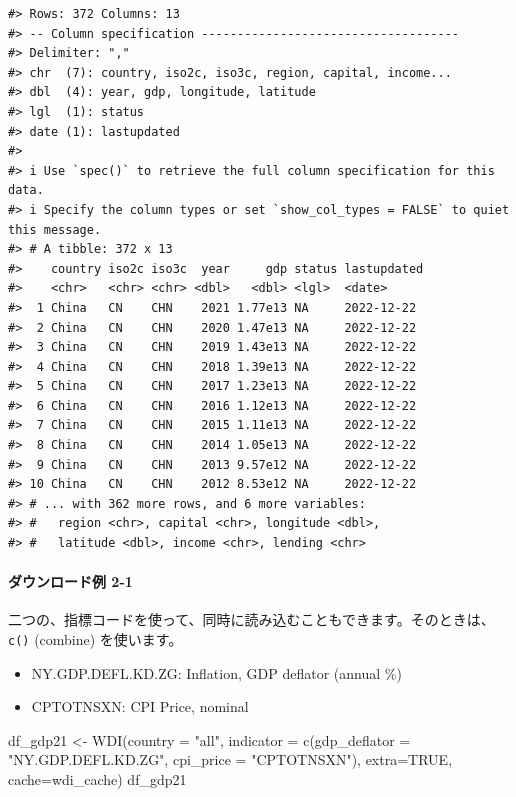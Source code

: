 \documentclass[
]{bxjsbook}
\newenvironment{Shaded}{\begin{snugshade}}{\end{snugshade}}
\newcommand{\AttributeTok}[1]{\textcolor[rgb]{0.77,0.63,0.00}{#1}}
\newcommand{\ConstantTok}[1]{\textcolor[rgb]{0.00,0.00,0.00}{#1}}
\newcommand{\FunctionTok}[1]{\textcolor[rgb]{0.00,0.00,0.00}{#1}}
\newcommand{\NormalTok}[1]{#1}
\newcommand{\OtherTok}[1]{\textcolor[rgb]{0.56,0.35,0.01}{#1}}
\newcommand{\StringTok}[1]{\textcolor[rgb]{0.31,0.60,0.02}{#1}}
\providecommand{\tightlist}{%
  \setlength{\itemsep}{0pt}\setlength{\parskip}{0pt}}
\theoremstyle{definition}
\theoremstyle{definition}
\theoremstyle{definition}
\theoremstyle{definition}
\theoremstyle{remark}
\begin{document}
\begin{verbatim}
#> Rows: 372 Columns: 13
#> -- Column specification ------------------------------------
#> Delimiter: ","
#> chr  (7): country, iso2c, iso3c, region, capital, income...
#> dbl  (4): year, gdp, longitude, latitude
#> lgl  (1): status
#> date (1): lastupdated
#> 
#> i Use `spec()` to retrieve the full column specification for this data.
#> i Specify the column types or set `show_col_types = FALSE` to quiet this message.
#> # A tibble: 372 x 13
#>    country iso2c iso3c  year     gdp status lastupdated
#>    <chr>   <chr> <chr> <dbl>   <dbl> <lgl>  <date>     
#>  1 China   CN    CHN    2021 1.77e13 NA     2022-12-22 
#>  2 China   CN    CHN    2020 1.47e13 NA     2022-12-22 
#>  3 China   CN    CHN    2019 1.43e13 NA     2022-12-22 
#>  4 China   CN    CHN    2018 1.39e13 NA     2022-12-22 
#>  5 China   CN    CHN    2017 1.23e13 NA     2022-12-22 
#>  6 China   CN    CHN    2016 1.12e13 NA     2022-12-22 
#>  7 China   CN    CHN    2015 1.11e13 NA     2022-12-22 
#>  8 China   CN    CHN    2014 1.05e13 NA     2022-12-22 
#>  9 China   CN    CHN    2013 9.57e12 NA     2022-12-22 
#> 10 China   CN    CHN    2012 8.53e12 NA     2022-12-22 
#> # ... with 362 more rows, and 6 more variables:
#> #   region <chr>, capital <chr>, longitude <dbl>,
#> #   latitude <dbl>, income <chr>, lending <chr>
\end{verbatim}

\hypertarget{ux30c0ux30a6ux30f3ux30edux30fcux30c9ux4f8b-2-1}{%
\paragraph{ダウンロード例 2-1}\label{ux30c0ux30a6ux30f3ux30edux30fcux30c9ux4f8b-2-1}}

二つの、指標コードを使って、同時に読み込むこともできます。そのときは、\texttt{c()} (combine) を使います。

\begin{itemize}
\tightlist
\item
  NY.GDP.DEFL.KD.ZG: Inflation, GDP deflator (annual \%)
\item
  CPTOTNSXN: CPI Price, nominal
\end{itemize}

\begin{Shaded}
\begin{Highlighting}[]
\NormalTok{df\_gdp21 }\OtherTok{\textless{}{-}} \FunctionTok{WDI}\NormalTok{(}\AttributeTok{country =} \StringTok{"all"}\NormalTok{, }
                \AttributeTok{indicator =} \FunctionTok{c}\NormalTok{(}\AttributeTok{gdp\_deflator =} \StringTok{"NY.GDP.DEFL.KD.ZG"}\NormalTok{, }
                              \AttributeTok{cpi\_price =} \StringTok{"CPTOTNSXN"}\NormalTok{), }
                \AttributeTok{extra=}\ConstantTok{TRUE}\NormalTok{, }\AttributeTok{cache=}\NormalTok{wdi\_cache)}
\NormalTok{df\_gdp21}
\end{Highlighting}
\end{Shaded}
\end{document}
